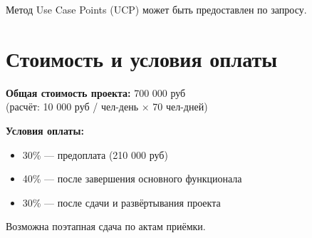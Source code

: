\documentclass[14pt, russian]{matmex-diploma-custom}
\begin{document}
\bigskip

Метод Use Case Points (UCP) может быть предоставлен по запросу.


\section{Стоимость и условия оплаты}

\textbf{Общая стоимость проекта:} 700 000 руб \\
(расчёт: 10 000 руб / чел-день × 70 чел-дней)

\bigskip

\textbf{Условия оплаты:}
\begin{itemize}[noitemsep]
    \item 30\% — предоплата (210 000 руб)
    \item 40\% — после завершения основного функционала
    \item 30\% — после сдачи и развёртывания проекта
\end{itemize}

Возможна поэтапная сдача по актам приёмки.
\end{document}
